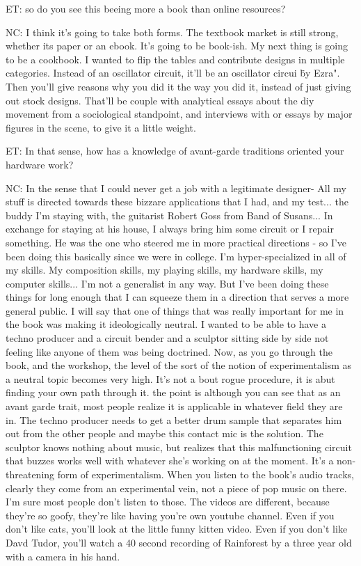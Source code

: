 ET: so do you see this beeing more a book than online resources? 

NC: I think it's going to take both forms. The textbook market is still strong, whether its paper or an ebook. It's going to be book-ish. My next thing is going to be a cookbook. I wanted to flip the tables and contribute designs in multiple categories. Instead of an oscillator circuit, it'll be an oscillator circui \"by Ezra". Then you'll give reasons why you did it the way you did it, instead of just giving out stock designs. That'll be couple with analytical essays about the diy movement from a sociological standpoint, and interviews with or essays by major figures in the scene, to give it a little weight. 

ET: In that sense, how has a knowledge of avant-garde traditions oriented your hardware work? 

NC: In the sense that I could never get a job with a legitimate designer- All my stuff is directed towards these bizzare applications that I had, and my test... the buddy I'm staying with, the guitarist Robert Goss from Band of Susans... In exchange for staying at his house, I always bring him some circuit or I repair something. He was the one who steered me in more practical directions - so I've been doing this basically since we were in college. I'm hyper-specialized in all of my skills. My composition skills, my playing skills, my hardware skills, my computer skills... I'm not a generalist in any way. But I've been doing these things for long enough that I can squeeze them in a direction that serves a more general public. I will say that one of things that was really important for me in the book was making it ideologically neutral. I wanted to be able to have a techno producer and a circuit bender and a sculptor sitting side by side not feeling like anyone of them was being doctrined. Now, as you go through the book, and the workshop, the level of the sort of the notion of experimentalism as a neutral topic becomes very high. It's not a bout rogue procedure, it is abut finding your own path through it. the point is although you can see that as an avant garde trait, most people realize it is applicable in whatever field they are in. The techno producer needs to get a better drum sample that separates him out from the other people and maybe this contact mic is the solution. The sculptor knows nothing about music, but realizes that this malfunctioning circuit that buzzes works well with whatever she's working on at the moment. It's a non-threatening form of experimentalism. When you listen to the book's audio tracks, clearly they come from an experimental vein, not a piece of pop music on there. I'm sure most people don't listen to those. The videos are different, because they're so goofy, they're like having you're own youtube channel. Even if you don't like cats, you'll look at the little funny kitten video. Even if you don't like Davd Tudor, you'll watch a 40 second recording of Rainforest by a three year old with a camera in his hand. 

